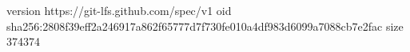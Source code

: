 version https://git-lfs.github.com/spec/v1
oid sha256:2808f39eff2a246917a862f65777d7f730fe010a4df983d6099a7088cb7e2fac
size 374374
